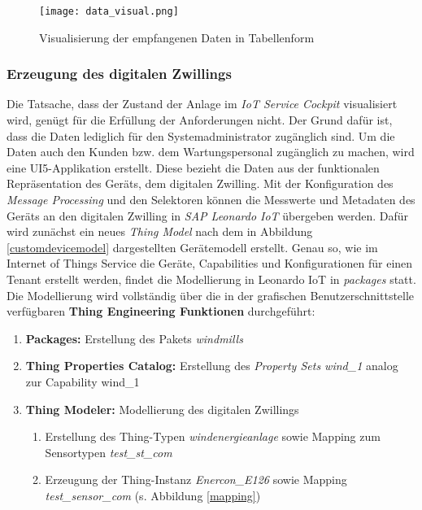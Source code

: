 \begin{figure}[H]
  \texttt{[image: data\_visual.png]}
  \caption{Visualisierung der empfangenen Daten in Tabellenform}
  \label{datavisual}
\end{figure}

\subsubsection{Erzeugung des digitalen Zwillings}

Die Tatsache, dass der Zustand der Anlage im \textit{IoT Service Cockpit} visualisiert wird, genügt für die Erfüllung der Anforderungen nicht. Der Grund dafür ist, dass die Daten lediglich für den Systemadministrator zugänglich sind. Um die Daten auch den Kunden bzw. dem Wartungspersonal zugänglich zu machen, wird eine UI5-Applikation erstellt. Diese bezieht die Daten aus der funktionalen Repräsentation des Geräts, dem digitalen Zwilling. Mit der Konfiguration des \textit{Message Processing} und den Selektoren können die Messwerte und Metadaten des Geräts an den digitalen Zwilling in \textit{SAP Leonardo IoT} übergeben werden. Dafür wird zunächst ein neues \textit{Thing Model} nach dem in Abbildung \ref{customdevicemodel} dargestellten Gerätemodell erstellt. Genau so, wie im Internet of Things Service die Geräte, Capabilities und Konfigurationen für einen Tenant erstellt werden, findet die Modellierung in Leonardo IoT in \textit{packages} statt. Die Modellierung wird vollständig über die in der grafischen Benutzerschnittstelle verfügbaren \textbf{Thing Engineering Funktionen} durchgeführt:
\begin{enumerate}
  \item \textbf{Packages:} Erstellung des Pakets \textit{windmills}
  \item \textbf{Thing Properties Catalog:} Erstellung des \textit{Property Sets wind\_1} analog zur Capability wind\_1
  \item \textbf{Thing Modeler:} Modellierung des digitalen Zwillings
  \begin{enumerate}
    \item Erstellung des Thing-Typen \textit{windenergieanlage} sowie Mapping zum Sensortypen \textit{test\_st\_com}
    \item Erzeugung der Thing-Instanz \textit{Enercon\_E126} sowie Mapping \textit{test\_sensor\_com} (s. Abbildung \ref{mapping})
  \end{enumerate}
\end{enumerate}

